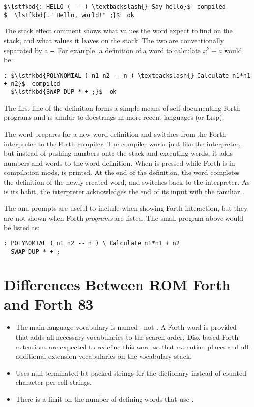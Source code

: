 \begin{lstlisting}[mathescape=true,numbers=none]
$\lstfkbd{: HELLO ( -- ) \textbackslash{} Say hello}$  compiled
$  \lstfkbd{." Hello, world!" ;}$  ok
\end{lstlisting}

\noindent The stack effect comment shows what values the word expect to find on the
stack, and what values it leaves on the stack. The two are conventionally
separated by a \texttt{--}. For example, a definition of a  word to
calculate $x^2 + a$ would be:

\begin{lstlisting}[mathescape=true,numbers=none]
: $\lstfkbd{POLYNOMIAL ( n1 n2 -- n ) \textbackslash{} Calculate n1*n1 + n2}$  compiled
  $\lstfkbd{SWAP DUP * + ;}$  ok
\end{lstlisting}

\noindent The first line of the definition forms a simple means of self-documenting Forth
programs and is similar to docstrings in more recent languages (or Lisp).

The \fw{:} word prepares for a new word definition and switches from the Forth
interpreter to the Forth compiler. The compiler works just like the
interpreter, but instead of pushing numbers onto the stack and executing words,
it adds numbers and words to the word definition. When  is
pressed while Forth is in compilation mode,  is printed. At
the end of the definition, the \fw{;} word completes the definition of the
newly created word, and switches back to the interpreter. As is its habit, the
interpreter acknowledges the end of its input with the familiar .

The  and  prompts are useful to include when
showing Forth interaction, but they are not shown when Forth {\em programs\/}
are listed. The small program above would be listed as:

\begin{lstlisting}[style=forthprogram]
: POLYNOMIAL ( n1 n2 -- n ) \ Calculate n1*n1 + n2
  SWAP DUP * + ;
\end{lstlisting}

\section{Differences Between ROM Forth and Forth 83}

\begin{itemize}
  \item The main language vocabulary is named , not
    . A Forth word  is provided that adds all
    necessary vocabularies to the search order. Disk-based Forth
    extensions are expected to redefine this word so that execution
    places  and all additional extension vocabularies on
    the vocabulary stack.
  \item Uses null-terminated bit-packed strings for the dictionary
    instead of counted character-per-cell strings.
  \item There is a limit on the number of defining words that use
    .
\end{itemize}

